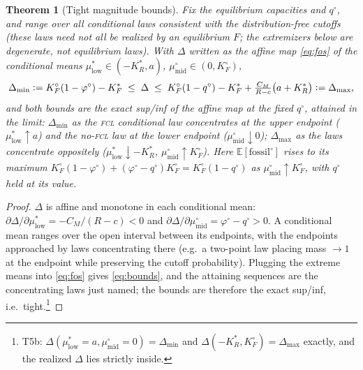 \documentclass[11pt,reqno]{amsart}
\theoremstyle{plain}
\newtheorem{theorem}{Theorem}
\theoremstyle{definition}
\theoremstyle{remark}
\newcommand{\KRs}{K_R^{*}}
\newcommand{\KFs}{K_F^{*}}
\newcommand{\KFo}{K_F^{\circ}}
\newcommand{\CM}{C_M}
\newcommand{\E}{\mathbb{E}}
\newcommand{\eqdef}{\vcentcolon=}
\begin{document}
\begin{theorem}[Tight magnitude bounds]\label{thm:tight}
Fix the equilibrium capacities and $q^{\circ}$, and range over all conditional laws
consistent with the distribution-free cutoffs (these laws need not all be realized
by an equilibrium $F$; the extremizers below are degenerate, not equilibrium
laws). With $\Delta$ written as the affine
map \eqref{eq:fos} of the conditional means
$\mu^{*}_{\mathrm{low}}\in(-\KRs,a)$, $\mu^{\circ}_{\mathrm{mid}}\in(0,\KFo)$,
\begin{equation}\label{eq:bounds}
  \Delta_{\min}\eqdef\KFo(1-\varphi^{\circ})-\KFs\;\le\;\Delta\;\le\;
  \KFo(1-q^{\circ})-\KFs+\tfrac{\CM}{R-c}\big(a+\KRs\big)\eqdef\Delta_{\max},
\end{equation}
and both bounds are the exact sup/inf of the affine map at the \emph{fixed}
$q^{\circ}$, attained in the limit: $\Delta_{\min}$ as the
\textsc{fcl} conditional law concentrates at the upper endpoint
($\mu^{*}_{\mathrm{low}}\!\uparrow a$) and the no-\textsc{fcl} law at the lower
endpoint ($\mu^{\circ}_{\mathrm{mid}}\!\downarrow0$); $\Delta_{\max}$ as the laws
concentrate oppositely ($\mu^{*}_{\mathrm{low}}\!\downarrow-\KRs$,
$\mu^{\circ}_{\mathrm{mid}}\!\uparrow\KFo$). Here
$\E[\text{fossil}^{\circ}]$ rises to its maximum
$\KFo(1-\varphi^{\circ})+(\varphi^{\circ}-q^{\circ})\KFo=\KFo(1-q^{\circ})$ as
$\mu^{\circ}_{\mathrm{mid}}\!\uparrow\KFo$, with $q^{\circ}$ held at its value.
\end{theorem}

\begin{proof}
$\Delta$ is affine and monotone in each conditional mean:
$\partial\Delta/\partial\mu^{*}_{\mathrm{low}}=-\CM/(R-c)<0$ and
$\partial\Delta/\partial\mu^{\circ}_{\mathrm{mid}}=\varphi^{\circ}-q^{\circ}>0$.
A conditional mean ranges over the open interval between its endpoints, with the
endpoints approached by laws concentrating there (e.g.\ a two-point law placing
mass $\to1$ at the endpoint while preserving the cutoff probability). Plugging the
extreme means into \eqref{eq:fos} gives \eqref{eq:bounds}, and the attaining
sequences are the concentrating laws just named; the bounds are therefore the
exact sup/inf, i.e.\ tight.\footnote{T5b: $\Delta(\mu^{*}_{\mathrm{low}}{=}a,\mu^{\circ}_{\mathrm{mid}}{=}0)=\Delta_{\min}$
and $\Delta(-\KRs,\KFo)=\Delta_{\max}$ exactly, and the realized $\Delta$ lies
strictly inside.}
\end{proof}

\end{document}
